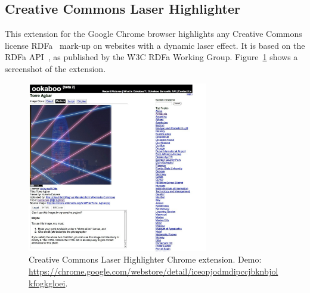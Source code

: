 \documentclass[12pt]{article}
\begin{document}
\subsection{Creative Commons Laser Highlighter}
This extension for the Google Chrome browser highlights any Creative Commons license RDFa~\cite{ben_adida_rdfa_2008} mark-up on websites with a dynamic laser effect. It is based on the RDFa API~\cite{rdfa:api}, as published by the W3C RDFa Working Group. Figure~\ref{fig:creative-commons-laser-highlighter} shows a screenshot of the extension.

\begin{figure}[htbp!]
\begin{center}
    \includegraphics[width=0.7\textwidth]{./resources/creative-commons-laser-highlighter.png}
    \caption[Creative Commons Laser Highlighter Chrome extension.]{Creative Commons Laser Highlighter Chrome extension. Demo: \url{https://chrome.google.com/webstore/detail/iceopjodmdipccjbknbjolkfogkgloei}.}
  \label{fig:creative-commons-laser-highlighter}
  \end{center}  
\end{figure}

\pagebreak
\end{document}
